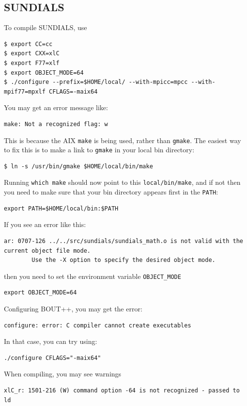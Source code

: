 \documentclass[12pt]{article}
\newcommand{\code}[1]{\texttt{#1}}
\begin{document}
\subsection{SUNDIALS}

To compile SUNDIALS, use 
\begin{verbatim}
$ export CC=cc
$ export CXX=xlC
$ export F77=xlf
$ export OBJECT_MODE=64
$ ./configure --prefix=$HOME/local/ --with-mpicc=mpcc --with-mpif77=mpxlf CFLAGS=-maix64
\end{verbatim}

You may get an error message like:
\begin{verbatim}
make: Not a recognized flag: w
\end{verbatim}
This is because the AIX \code{make} is being used, rather than \code{gmake}.
The easiest way to fix this is to make a link to \code{gmake} in your local
bin directory:
\begin{verbatim}
$ ln -s /usr/bin/gmake $HOME/local/bin/make
\end{verbatim}
Running \code{which make} should now point to this \code{local/bin/make},
and if not then you need to make sure that your bin directory appears first
in the \code{PATH}:
\begin{verbatim}
export PATH=$HOME/local/bin:$PATH
\end{verbatim}

If you see an error like this:
\begin{verbatim}
ar: 0707-126 ../../src/sundials/sundials_math.o is not valid with the current object file mode.
        Use the -X option to specify the desired object mode.
\end{verbatim}
then you need to set the environment variable \code{OBJECT\_MODE}
\begin{verbatim}
export OBJECT_MODE=64
\end{verbatim}

Configuring BOUT++, you may get the error:
\begin{verbatim}
configure: error: C compiler cannot create executables
\end{verbatim}
In that case, you can try using:
\begin{verbatim}
./configure CFLAGS="-maix64"
\end{verbatim}

When compiling, you may see warnings
\begin{verbatim}
xlC_r: 1501-216 (W) command option -64 is not recognized - passed to ld
\end{verbatim}
\end{document}
